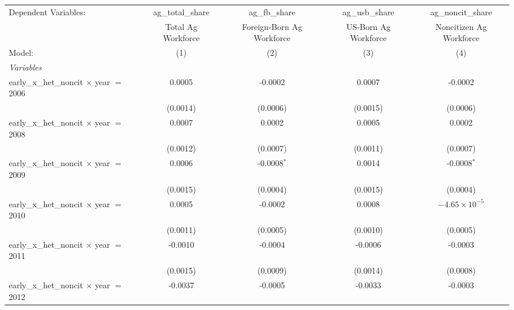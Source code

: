 
\begingroup
\centering
\begin{tabular}{lcccc}
   \tabularnewline \midrule \midrule
   Dependent Variables:                             & ag\_total\_share   & ag\_fb\_share             & ag\_usb\_share       & ag\_noncit\_share\\    
                                                    & Total Ag Workforce & Foreign-Born Ag Workforce & US-Born Ag Workforce & Noncitizen Ag Workforce \\   
   Model:                                           & (1)                & (2)                       & (3)                  & (4)\\  
   \midrule
   \emph{Variables}\\
   early\_x\_het\_noncit $\times$ year $=$ 2006     & 0.0005             & -0.0002                   & 0.0007               & -0.0002\\   
                                                    & (0.0014)           & (0.0006)                  & (0.0015)             & (0.0006)\\   
   early\_x\_het\_noncit $\times$ year $=$ 2008     & 0.0007             & 0.0002                    & 0.0005               & 0.0002\\   
                                                    & (0.0012)           & (0.0007)                  & (0.0011)             & (0.0007)\\   
   early\_x\_het\_noncit $\times$ year $=$ 2009     & 0.0006             & -0.0008$^{*}$             & 0.0014               & -0.0008$^{*}$\\   
                                                    & (0.0015)           & (0.0004)                  & (0.0015)             & (0.0004)\\   
   early\_x\_het\_noncit $\times$ year $=$ 2010     & 0.0005             & -0.0002                   & 0.0008               & $-4.65\times 10^{-5}$\\    
                                                    & (0.0011)           & (0.0005)                  & (0.0010)             & (0.0005)\\   
   early\_x\_het\_noncit $\times$ year $=$ 2011     & -0.0010            & -0.0004                   & -0.0006              & -0.0003\\   
                                                    & (0.0015)           & (0.0009)                  & (0.0014)             & (0.0008)\\   
   early\_x\_het\_noncit $\times$ year $=$ 2012     & -0.0037            & -0.0005                   & -0.0033              & -0.0003\\   

\end{tabular}
